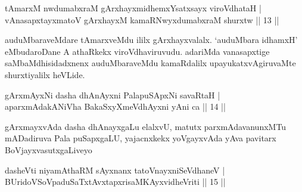 
\begin{shl}
tAmarxM nwdumabxraM gArxhayxmidhemxYsatxsayx viroVdhataH | \\
vAnasapxtayxmatoV gArxhayxM kamaRNwyxdumabxraM shurxtw \hfill|| 13 || 
\end{shl}

\begin{artha}
auduMbaraveMdare tAmarxveMdu ililx gArxhayxvalalx. `auduMbara idhamxH' eMbudaroDane A athaRkekx viroVdhaviruvudu. adariMda vanasapxtige saMbaMdhisidadxnenx auduMbaraveMdu kamaRdalilx upayukatxvAgiruvaMte shurxtiyalilx heVLide.
\end{artha}


\begin{shl}
gArxmAyxNi dasha dhAnAyxni PalapuSApxNi savaRtaH | \\
aparxmAdakANiVha BakaSxyXmeVdhAyxni yAni ca \hfill|| 14 || 
\end{shl}

\begin{artha}
gArxmayxvAda dasha dhAnayxgaLu elalxvU, matutx parxmAdavanunxMTu mADadiruva Pala puSapxgaLU, yajacnxkekx yoVgayxvAda yAva pavitarx BoVjayxvasutxgaLiveyo 
\end{artha}


\begin{shl}
dasheVti niyamAthaRM sAyxnanx tatoV\s nayxniSeVdhaneV | \\
BUridoVSoVpaduSaTxtAvxtapxrisaMKAyxvidheVriti \hfill|| 15 || 
\end{shl}

